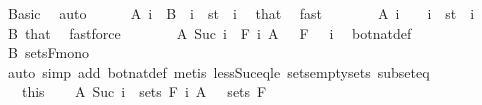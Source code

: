 \begin{isabellebody}
\ Basic\ \isamarkupfalse%
\ auto\isanewline
\ \ \ \ \isamarkupfalse%
\ {\isachardoublequoteopen}A\ i\ {\isacharequal}{\kern0pt}\ B{\isachardoublequoteclose}\ \ {\isachardoublequoteopen}i\ {\isasymin}\ {\isacharbraceleft}{\kern0pt}s{\isacharless}{\kern0pt}{\isachardot}{\kern0pt}{\isachardot}{\kern0pt}t{\isacharbraceright}{\kern0pt}{\isachardoublequoteclose}\ \ i\ \isamarkupfalse%
\ that\ \isamarkupfalse%
\ fast\isanewline
\ \ \ \ \isamarkupfalse%
\ \isamarkupfalse%
\ {\isachardoublequoteopen}A\ i\ {\isacharequal}{\kern0pt}\ {\isacharbraceleft}{\kern0pt}{\isacharbraceright}{\kern0pt}{\isachardoublequoteclose}\ \ {\isachardoublequoteopen}i\ {\isasymnotin}\ {\isacharbraceleft}{\kern0pt}s{\isacharless}{\kern0pt}{\isachardot}{\kern0pt}{\isachardot}{\kern0pt}t{\isacharbraceright}{\kern0pt}{\isachardoublequoteclose}\ \ i\ \isamarkupfalse%
\ B\ that\ \isamarkupfalse%
\ fastforce\isanewline
\ \ \ \ \isamarkupfalse%
\ \isamarkupfalse%
\ {\isachardoublequoteopen}A\ {\isacharparenleft}{\kern0pt}Suc\ i{\isacharparenright}{\kern0pt}\ {\isasymin}\ F\ i{\isachardoublequoteclose}\ {\isachardoublequoteopen}A\ {}\ {\isasymin}\ F\ {}{\isachardoublequoteclose}\ \ i\ \isamarkupfalse%
\ bot{\isacharunderscore}{\kern0pt}nat{\isacharunderscore}{\kern0pt}def\ \isamarkupfalse%
\ B\ sets{\isacharunderscore}{\kern0pt}F{\isacharunderscore}{\kern0pt}mono\ \isamarkupfalse%
\ {\isacharparenleft}{\kern0pt}auto\ simp\ add{\isacharcolon}{\kern0pt}\ bot{\isacharunderscore}{\kern0pt}nat{\isacharunderscore}{\kern0pt}def{\isacharparenright}{\kern0pt}\ {\isacharparenleft}{\kern0pt}metis\ less{\isacharunderscore}{\kern0pt}Suc{\isacharunderscore}{\kern0pt}eq{\isacharunderscore}{\kern0pt}le\ sets{\isachardot}{\kern0pt}empty{\isacharunderscore}{\kern0pt}sets\ subset{\isacharunderscore}{\kern0pt}eq{\isacharparenright}{\kern0pt}\isanewline
\ \ \isacommand{{\isacharbraceright}{\kern0pt}}\isamarkupfalse%
\isanewline
\ \ \isamarkupfalse%
\ {\isacharasterisk}{\kern0pt}{\isacharasterisk}{\kern0pt}\ {\isacharequal}{\kern0pt}\ this\isanewline
\ \ \isamarkupfalse%
\ {\isachardoublequoteopen}A\ {\isacharparenleft}{\kern0pt}Suc\ i{\isacharparenright}{\kern0pt}\ {\isasymin}\ sets\ {\isacharparenleft}{\kern0pt}F\ i{\isacharparenright}{\kern0pt}{\isachardoublequoteclose}\ {\isachardoublequoteopen}A\ {}\ {\isasymin}\ sets\ {\isacharparenleft}{\kern0pt}F\ {}{\isacharparenright}{\kern0pt}{\isachardoublequoteclose}\ \isamarkupfalse%

\end{isabellebody}
